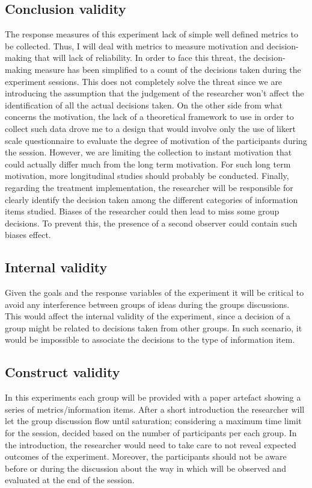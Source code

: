 \documentclass[runningheads]{llncs}
\begin{document}
\subsection{Conclusion validity}

The response measures of this experiment lack of simple well defined metrics to be collected. Thus, I will deal with metrics to measure motivation and decision-making that will lack of reliability. In order to face this threat, the decision-making measure has been simplified to a count of the decisions taken during the experiment sessions. This does not completely solve the threat since we are introducing the assumption that the judgement of the researcher won't affect the identification of all the actual decisions taken. On the other side from what concerns the motivation, the lack of a theoretical framework to use in order to collect such data drove me to a design that would involve only the use of likert scale questionnaire to evaluate the degree of motivation of the participants during the session. However, we are limiting the collection to instant motivation that could actually differ much from the long term motivation. For such long term motivation, more longitudinal studies should probably be conducted. Finally, regarding the treatment implementation, the researcher will be responsible for clearly identify the decision taken among the different categories of information items studied. Biases of the researcher could then lead to miss some group decisions. To prevent this, the presence of a second observer could contain such biases effect.

\subsection{Internal validity}

Given the goals and the response variables of the experiment it will be critical to avoid any interference between groups of ideas during the groups discussions. This would affect the internal validity of the experiment, since a decision of a group might be related to decisions taken from other groups. In such scenario, it would be impossible to associate the decisions to the type of information item.

\subsection{Construct validity}

In this experiments each group will be provided with a paper artefact showing a series of metrics/information items. After a short introduction the researcher will let the group discussion flow until saturation; considering a maximum time limit for the session, decided based on the number of participants per each group. In the introduction, the researcher would need to take care to not reveal expected outcomes of the experiment. Moreover, the participants should not be aware before or during the discussion about the way in which will be observed and evaluated at the end of the session.
\end{document}
